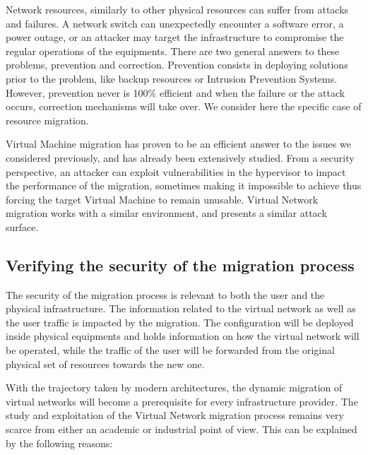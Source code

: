 Network resources, similarly to other physical resources can suffer from attacks and failures. A network switch can unexpectedly encounter a software error, a power outage, or an attacker may target the infrastructure to compromise the regular operations of the equipments. There are two general answers to these problems, prevention and correction. Prevention consists in deploying solutions prior to the problem, like backup resources or Intrusion Prevention Systems.
However, prevention never is 100\% efficient and when the failure or the attack occurs, correction mechanisms will take over. We consider here the specific case of resource migration.

Virtual Machine migration has proven to be an efficient answer to the issues we considered previously, and has already been extensively studied. From a security perspective, an attacker can exploit vulnerabilities in the hypervisor to impact the performance of the migration, sometimes making it impossible to achieve thus forcing the target Virtual Machine to remain unusable.
Virtual Network migration works with a similar environment, and presents a similar attack surface.


\subsection{Verifying the security of the migration process}
The security of the migration process is relevant to both the user and the physical infrastructure.
The information related to the virtual network as well as the user traffic is impacted by the migration. The configuration will be deployed inside physical equipments and holds information on how the virtual network will be operated, while the traffic of the user will be forwarded from the original physical set of resources towards the new one.


With the trajectory taken by modern architectures, the dynamic migration of virtual networks will become a prerequisite for every infrastructure provider.
The study and exploitation of the Virtual Network migration process remains very scarce from either an academic or industrial point of view. This can be explained by the following reasons:

